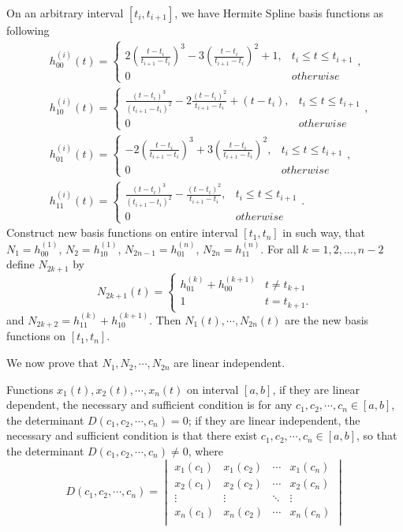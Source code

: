 On an arbitrary interval $[t_i,t_{i+1}]$, we have Hermite Spline basis functions as following
\begin{align} \label{hermitebasis1}
&h_{00}^{(i)}(t)=
\begin{cases}
2(\frac{t-t_{i}}{t_{i+1}-t_{i}})^3-3(\frac{t-t_{i}}{t_{i+1}-t_{i}})^2+1, & t_i\leq t \leq t_{i+1} \\ 
0 & otherwise
\end{cases}, \\ \label{hermitebasis2}
&h_{10}^{(i)}(t)=\begin{cases}
\frac{(t-t_{i})^3}{(t_{i+1}-t_{i})^2}-2\frac{(t-t_{i})^2}{t_{i+1}-t_{i}}+(t-t_{i}), & t_i\leq t \leq t_{i+1} \\ 
0 &  otherwise
\end{cases},\\ \label{hermitebasis3}
&h_{01}^{(i)}(t)=
\begin{cases}
-2(\frac{t-t_i}{t_{i+1}-t_i})^3+3(\frac{t-t_i}{t_{i+1}-t_i})^2, & t_i\leq t \leq t_{i+1} \\ 
0 &  otherwise
\end{cases},\\ \label{hermitebasis4}
&h_{11}^{(i)}(t)=\begin{cases}
\frac{(t-t_i)^3}{(t_{i+1}-t_i)^2}-\frac{(t-t_i)^2}{t_{i+1}-t_i}, & t_i\leq t \leq t_{i+1} \\ 
0 &  otherwise
\end{cases}.
\end{align}
 Construct new basis functions on entire interval $[t_1,t_n]$ in such way, that $N_1 = h^{(1)}_{00}$, $N_2 = h^{(1)}_{10}$, $N_{2n-1} = h_{01}^{(n)}$, $N_{2n} = h_{11}^{(n)}$. For all $k=1,2,\ldots,n-2$ define $N_{2k+1}$ by
\[N_{2k+1}(t) = \begin{cases} h_{01}^{(k)}+h_{00}^{(k+1)} & t \neq t_{k+1} \\ 1 & t = t_{k+1}.\end{cases}\]
and $N_{2k+2} = h_{11}^{(k)}+h_{10}^{(k+1)}$. Then $N_1(t), \cdots, N_{2n}(t)$ are the new basis functions on $[t_1,t_n]$.

We now prove that $N_1, N_2, \cdots, N_{2n}$ are linear independent. 
\begin{lemma}\cite{peng1983}
Functions $x_1(t),x_2(t),\cdots,x_n(t)$ on interval $[a,b]$, if they are linear dependent, the necessary and sufficient condition is for any $c_1,c_2,\cdots,c_n \in [a,b]$, the determinant $D(c_1,c_2,\cdots,c_n)=0$; if they are linear independent, the necessary and sufficient condition is that there exist $c_1,c_2,\cdots,c_n \in [a,b]$, so that the determinant $D(c_1,c_2,\cdots,c_n) \neq 0$, where 
\begin{equation}
D(c_1,c_2,\cdots,c_n)=
\begin{vmatrix}
x_1(c_1) & x_1(c_2) & \cdots& x_1(c_n)\\
x_2(c_1) & x_2(c_2)& \cdots & x_2(c_n)\\
 \vdots  &  \vdots  & \ddots  & \vdots  \\  
x_n(c_1) & x_n(c_2) & \cdots & x_n(c_n)\\
\end{vmatrix}
\end{equation}
\end{lemma}


